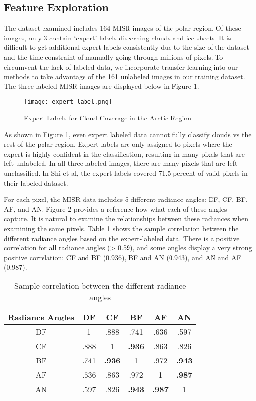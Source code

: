 \documentclass[11pt,letterpaper]{article}
\begin{document}
\subsection{Feature Exploration}
The dataset examined includes 164 MISR images of the polar region. Of these images, only 3 contain ‘expert’ labels discerning clouds and ice sheets. It is difficult to get additional expert labels consistently due to the size of the dataset and the time constraint of manually going through millions of pixels. To circumvent the lack of labeled data, we incorporate transfer learning into our methods to take advantage of the 161 unlabeled images in our training dataset. The three labeled MISR images are displayed below in Figure 1. 

\begin{figure} [H]
    \centering
    \texttt{[image: expert\_label.png]}
    \caption{Expert Labels for Cloud Coverage in the Arctic Region}
    \label{fig:enter-label}
\end{figure}

\vspace{1cm}

As shown in Figure 1, even expert labeled data cannot fully classify clouds vs the rest of the polar region. Expert labels are only assigned to pixels where the expert is highly confident in the classification, resulting in many pixels that are left unlabeled. In all three labeled images, there are many pixels that are left unclassified. In Shi et al, the expert labels covered 71.5 percent of valid pixels in their labeled dataset. 

For each pixel, the MISR data includes 5 different radiance angles: DF, CF, BF, AF, and AN. Figure 2 provides a reference how what each of these angles capture. It is natural to examine the relationships between these radiances when examining the same pixels. Table 1 shows the sample correlation between the different radiance angles based on the expert-labeled data. There is a positive correlation for all radiance angles (> 0.59), and some angles display a very strong positive correlation: CF and BF (0.936), BF and AN (0.943), and AN and AF (0.987). 

\begin{table}[H]
\centering
\caption{Sample correlation between the different radiance angles}
\renewcommand{\arraystretch}{1.25}
\begin{tabular}{|c|c|c|c|c|c|}
\hline
Radiance Angles & DF & CF & BF & AF & AN\\ \hline
DF & 1 & .888 & .741 & .636 & .597 \\ \hline
CF & .888 & 1 & \textbf{.936} & .863 & .826 \\ \hline
BF & .741 & \textbf{.936} & 1 & .972 & \textbf{.943} \\ \hline
AF & .636 & .863 & .972 & 1 & \textbf{.987} \\ \hline
AN & .597 & .826 & \textbf{.943} & \textbf{.987} & 1 \\ \hline
\end{tabular}
\end{table}
\end{document}
